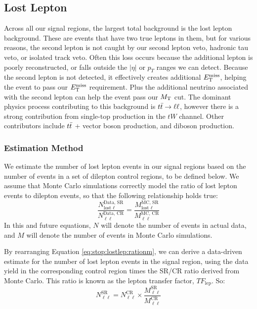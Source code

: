 \subsection{Lost Lepton}
\label{ssec:stop:lostlep}

Across all our signal regions, the largest total background
is the lost lepton background. These are events that have two true
leptons in them, but for various reasons, the second lepton is not
caught by our second lepton veto, hadronic tau veto, or isolated track
veto. Often this loss occurs because the additional lepton is poorly
reconstructed, or falls outside the $|\eta|$ or $p_T$ ranges we can
detect. Because the second lepton is not detected, it effectively
creates additional $E_\text{T}^\text{miss}$, helping the event to pass our $E_\text{T}^\text{miss}$
requirement. Plus the additional neutrino associated with the second
lepton can help the event pass our $M_\text{T}$ cut. The dominant physics
process contributing to this background is $t\bar{t} \rightarrow \ell\ell$, however there
is a strong contribution from single-top production in the $tW$
channel. Other contributors include $t\bar{t}$ + vector boson
production, and diboson production.

\subsubsection{Estimation Method}
\label{sssec:stop:lostlep:estimation}

We estimate the number of lost lepton events in our signal regions
based on the number of events in a set of dilepton control regions, to be
defined below. We assume that Monte Carlo simulations correctly model
the ratio of lost lepton events to dilepton events, so that the
following relationship holds true:
\begin{equation}
\label{eq:stop:lostlep:rationm}
\frac{N_{\text{lost }\ell}^\text{Data, SR}}{N_{\ell\ell}^\text{Data, CR}} =
\frac{M_{\text{lost }\ell}^\text{MC, SR}}{M_{\ell\ell}^\text{MC, CR}}
\end{equation}
In this and future equations, $N$ will denote the number of events in
actual data, and $M$ will denote the number of events in Monte Carlo
simulations.

By rearranging Equation \ref{eq:stop:lostlep:rationm}, we can derive
a data-driven estimate for the number of lost lepton events in the
signal region, using the data yield in the corresponding control region
times the SR/CR ratio derived from Monte Carlo. This ratio is known as
the lepton transfer factor, $TF_\text{lep}$. So:
\begin{equation}
\label{eq:stop:lostlep:estimate}
N_{\ell\ell}^\text{SR} = N_{\ell\ell}^\text{CR} \times \frac{M_{\ell\ell}^\text{SR}}{M_{\ell\ell}^\text{CR}}
\end{equation}

